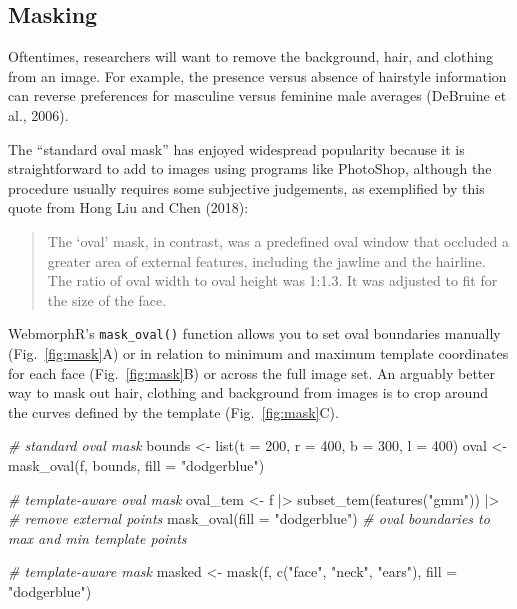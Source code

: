 \documentclass[
  man,floatsintext]{apa6}
\newenvironment{Shaded}{\begin{snugshade}}{\end{snugshade}}
\newcommand{\AttributeTok}[1]{\textcolor[rgb]{0.77,0.63,0.00}{#1}}
\newcommand{\CommentTok}[1]{\textcolor[rgb]{0.56,0.35,0.01}{\textit{#1}}}
\newcommand{\DecValTok}[1]{\textcolor[rgb]{0.00,0.00,0.81}{#1}}
\newcommand{\FunctionTok}[1]{\textcolor[rgb]{0.00,0.00,0.00}{#1}}
\newcommand{\NormalTok}[1]{#1}
\newcommand{\OtherTok}[1]{\textcolor[rgb]{0.56,0.35,0.01}{#1}}
\newcommand{\SpecialCharTok}[1]{\textcolor[rgb]{0.00,0.00,0.00}{#1}}
\newcommand{\StringTok}[1]{\textcolor[rgb]{0.31,0.60,0.02}{#1}}
\begin{document}
\hypertarget{masking}{%
\subsection{Masking}\label{masking}}

Oftentimes, researchers will want to remove the background, hair, and clothing from an image. For example, the presence versus absence of hairstyle information can reverse preferences for masculine versus feminine male averages (DeBruine et al., 2006).

The ``standard oval mask'' has enjoyed widespread popularity because it is straightforward to add to images using programs like PhotoShop, although the procedure usually requires some subjective judgements, as exemplified by this quote from Hong Liu and Chen (2018):

\begin{quote}
The `oval' mask, in contrast, was a predefined oval window that occluded a greater area of external features, including the jawline and the hairline. The ratio of oval width to oval height was 1:1.3. It was adjusted to fit for the size of the face.
\end{quote}

WebmorphR's \texttt{mask\_oval()} function allows you to set oval boundaries manually (Fig.~\ref{fig:mask}A) or in relation to minimum and maximum template coordinates for each face (Fig.~\ref{fig:mask}B) or across the full image set. An arguably better way to mask out hair, clothing and background from images is to crop around the curves defined by the template (Fig.~\ref{fig:mask}C).

\begin{Shaded}
\begin{Highlighting}[]
\CommentTok{\# standard oval mask}
\NormalTok{bounds }\OtherTok{\textless{}{-}} \FunctionTok{list}\NormalTok{(}\AttributeTok{t =} \DecValTok{200}\NormalTok{, }\AttributeTok{r =} \DecValTok{400}\NormalTok{, }\AttributeTok{b =} \DecValTok{300}\NormalTok{, }\AttributeTok{l =} \DecValTok{400}\NormalTok{)}
\NormalTok{oval }\OtherTok{\textless{}{-}} \FunctionTok{mask\_oval}\NormalTok{(f, bounds, }\AttributeTok{fill =} \StringTok{"dodgerblue"}\NormalTok{)}

\CommentTok{\# template{-}aware oval mask}
\NormalTok{oval\_tem }\OtherTok{\textless{}{-}}\NormalTok{ f }\SpecialCharTok{|\textgreater{}}
  \FunctionTok{subset\_tem}\NormalTok{(}\FunctionTok{features}\NormalTok{(}\StringTok{"gmm"}\NormalTok{)) }\SpecialCharTok{|\textgreater{}} \CommentTok{\# remove external points}
  \FunctionTok{mask\_oval}\NormalTok{(}\AttributeTok{fill =} \StringTok{"dodgerblue"}\NormalTok{) }\CommentTok{\# oval boundaries to max and min template points}

\CommentTok{\# template{-}aware mask}
\NormalTok{masked }\OtherTok{\textless{}{-}} \FunctionTok{mask}\NormalTok{(f, }\FunctionTok{c}\NormalTok{(}\StringTok{"face"}\NormalTok{, }\StringTok{"neck"}\NormalTok{, }\StringTok{"ears"}\NormalTok{), }\AttributeTok{fill =} \StringTok{"dodgerblue"}\NormalTok{)}
\end{Highlighting}
\end{Shaded}
\end{document}
